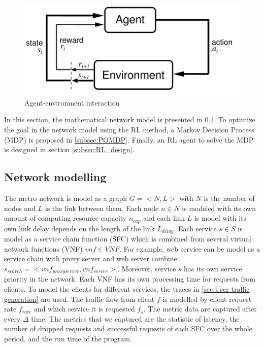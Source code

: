 \documentclass[conference]{IEEEtran}
\begin{document}
\begin{figure}[]
    \centering
        \includegraphics[scale = 0.6]{imgs/DRL.png}
        \caption{Agent-environment interaction}
        \label{fig:RL_overview}
    \end{figure}

In this section, the mathematical network model is presented in \ref{subsec:network_model}. To optimize the goal in the network model using the RL method, a Markov Decision Process (MDP) is proposed in \ref{subsec:POMDP}. Finally, an RL agent to solve the MDP is designed in section \ref{subsec:RL_design}.

\subsection{Network modelling}
\label{subsec:network_model}
The metro network is model as a graph $G = <N, L> $ with $N$ is the number of nodes and $L$ is the link between them. Each node $n \in N$ is modeled with its own amount of computing resource capacity $n_{cap}$ and each link $L$ is model with its own link delay depends on the length of the link $L_{delay}$. Each service $s \in S$ is model as a service chain function (SFC) which is combined from several virtual network functions (VNF) $vnf \in VNF$. For example, web service can be model as a service chain with proxy server and web server combine: $s_{search} = <vnf_{proxy server}, vnf_{server}>$. Moreover, service $s$ has its own service priority in the network. Each VNF has its own processing time for requests from clients. To model the clients for different services, the traces in \ref{sec:User traffic generation} are used. The traffic flow from client $f$ is modelled by client request rate $f_{rate}$ and which service it is requested $f_s$. The metric data are captured after every $\Delta$ time. The metrics that we captured are the statistic of latency, the number of dropped requests and successful requests of each SFC over the whole period, and the run time of the program. 
\end{document}
